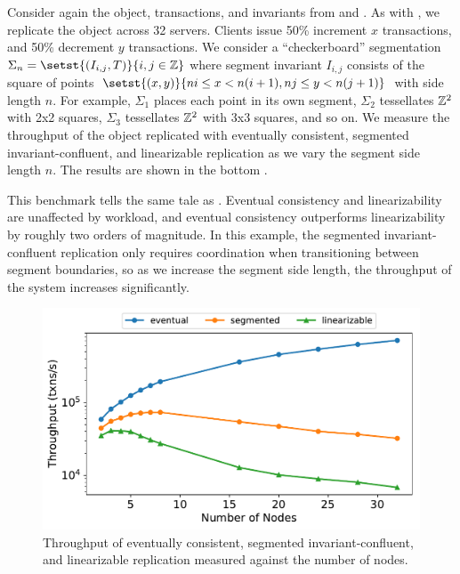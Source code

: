 \begin{benchmark}
  Consider again the object, transactions, and invariants from 
  and . As with , we replicate
  the object across 32 servers. Clients issue 50\% increment $x$ transactions,
  and 50\% decrement $y$ transactions. We consider a ``checkerboard''
  segmentation $\Sigma_n = \setst{(I_{i, j}, T)}{i, j \in \ints}$ where segment
  invariant $I_{i, j}$ consists of the square of points $\setst{(x, y)}{ni \leq
  x < n(i + 1), nj \leq y < n(j + 1)}$ with side length $n$. For example,
  $\Sigma_1$ places each point in its own segment, $\Sigma_2$ tessellates
  $\mathbb{Z}^2$ with 2x2 squares, $\Sigma_3$ tessellates $\mathbb{Z}^2$ with 3x3
  squares, and so on. We measure the throughput of the object replicated with
  eventually consistent, segmented invariant-confluent, and linearizable
  replication as we vary the segment side length $n$. The results are shown in
  the bottom .

  This benchmark tells the same tale as . Eventual
  consistency and linearizability are unaffected by workload, and eventual
  consistency outperforms linearizability by roughly two orders of magnitude.
  In this example, the segmented invariant-confluent replication only requires
  coordination when transitioning between segment boundaries, so as we increase
  the segment side length, the throughput of the system increases
  significantly.
\end{benchmark}

\begin{figure}[ht]
  \centering
  \includegraphics[width=\columnwidth]{figures/vary_nodes.pdf}
  \caption{%
    Throughput of eventually consistent, segmented invariant-confluent, and
    linearizable replication measured against the number of
    nodes.
  }
\end{figure}

